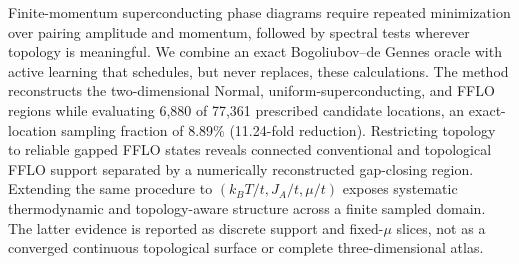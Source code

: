 Finite-momentum superconducting phase diagrams require repeated minimization over pairing amplitude and momentum, followed by spectral tests wherever topology is meaningful.  We combine an exact Bogoliubov--de Gennes oracle with active learning that schedules, but never replaces, these calculations.  The method reconstructs the two-dimensional Normal, uniform-superconducting, and FFLO regions while evaluating 6,880 of 77,361 prescribed candidate locations, an exact-location sampling fraction of 8.89\% (11.24-fold reduction).  Restricting topology to reliable gapped FFLO states reveals connected conventional and topological FFLO support separated by a numerically reconstructed gap-closing region.  Extending the same procedure to $(k_BT/t,J_A/t,\mu/t)$ exposes systematic thermodynamic and topology-aware structure across a finite sampled domain.  The latter evidence is reported as discrete support and fixed-$\mu$ slices, not as a converged continuous topological surface or complete three-dimensional atlas.
